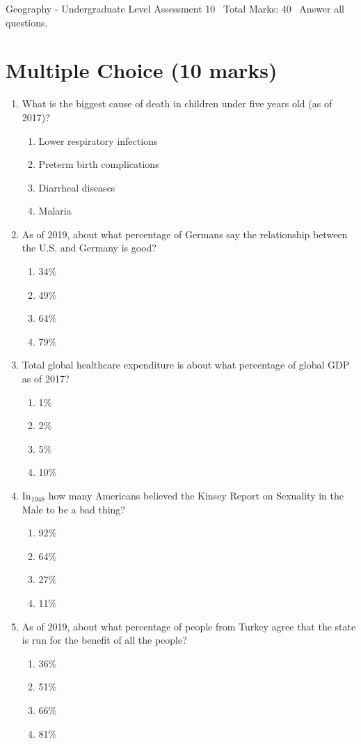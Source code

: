 \documentclass[12pt]{article}
\begin{document}
\begin{center}
Geography - Undergraduate Level Assessment 10 \
Total Marks: 40 \
Answer all questions.
\end{center}

\section*{Multiple Choice (10 marks)}
\begin{enumerate}[label=\arabic*.]
\item What is the biggest cause of death in children under five years old (as of 2017)?
\begin{enumerate}[label=(\alph*)]
    \item Lower respiratory infections
    \item Preterm birth complications
    \item Diarrheal diseases
    \item Malaria
\end{enumerate}
\item As of 2019, about what percentage of Germans say the relationship between the U.S. and Germany is good?
\begin{enumerate}[label=(\alph*)]
    \item 34\%
    \item 49\%
    \item 64\%
    \item 79\%
\end{enumerate}
\item Total global healthcare expenditure is about what percentage of global GDP as of 2017?
\begin{enumerate}[label=(\alph*)]
    \item 1\%
    \item 2\%
    \item 5\%
    \item 10\%
\end{enumerate}
\item In$_{1948}$ how many Americans believed the Kinsey Report on Sexuality in the Male to be a bad thing?
\begin{enumerate}[label=(\alph*)]
    \item 92\%
    \item 64\%
    \item 27\%
    \item 11\%
\end{enumerate}
\item As of 2019, about what percentage of people from Turkey agree that the state is run for the benefit of all the people?
\begin{enumerate}[label=(\alph*)]
    \item 36\%
    \item 51\%
    \item 66\%
    \item 81\%
\end{enumerate}
\end{enumerate}
\end{document}
